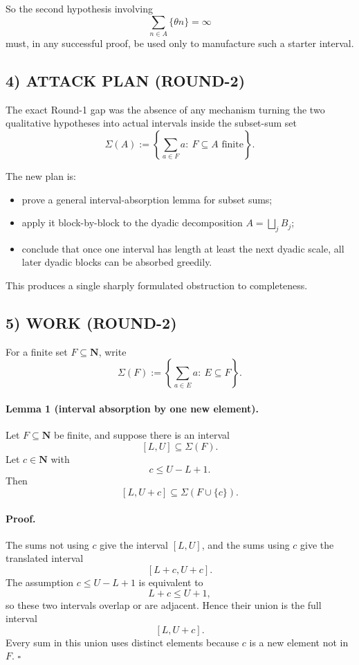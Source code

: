 So the second hypothesis involving
\[
\sum_{n\in A}\{\theta n\}=\infty
\]
must, in any successful proof, be used only to manufacture such a starter interval.

\subsection*{4) ATTACK PLAN (ROUND-2)}
The exact Round-1 gap was the absence of any mechanism turning the two qualitative hypotheses into actual intervals inside the subset-sum set
\[
\Sigma(A):=\left\{\sum_{a\in F}a:\ F\subseteq A\text{ finite}\right\}.
\]

The new plan is:

\begin{itemize}
\item prove a general interval-absorption lemma for subset sums;
\item apply it block-by-block to the dyadic decomposition $A=\bigsqcup_j B_j$;
\item conclude that once one interval has length at least the next dyadic scale, all later dyadic blocks can be absorbed greedily.
\end{itemize}

This produces a single sharply formulated obstruction to completeness.

\subsection*{5) WORK (ROUND-2)}
For a finite set $F\subseteq \mathbf{N}$, write
\[
\Sigma(F):=\left\{\sum_{a\in E} a:\ E\subseteq F\right\}.
\]

\paragraph{Lemma 1 (interval absorption by one new element).}
Let $F\subseteq \mathbf{N}$ be finite, and suppose there is an interval
\[
[L,U]\subseteq \Sigma(F).
\]
Let $c\in \mathbf{N}$ with
\[
c\le U-L+1.
\]
Then
\[
[L,U+c]\subseteq \Sigma(F\cup\{c\}).
\]

\paragraph{Proof.}
The sums not using $c$ give the interval $[L,U]$, and the sums using $c$ give the translated interval
\[
[L+c,U+c].
\]
The assumption $c\le U-L+1$ is equivalent to
\[
L+c\le U+1,
\]
so these two intervals overlap or are adjacent. Hence their union is the full interval
\[
[L,U+c].
\]
Every sum in this union uses distinct elements because $c$ is a new element not in $F$.
\hfill$\square$

